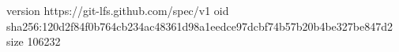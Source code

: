version https://git-lfs.github.com/spec/v1
oid sha256:120d2f84f0b764cb234ac48361d98a1eedce97dcbf74b57b20b4be327be847d2
size 106232

